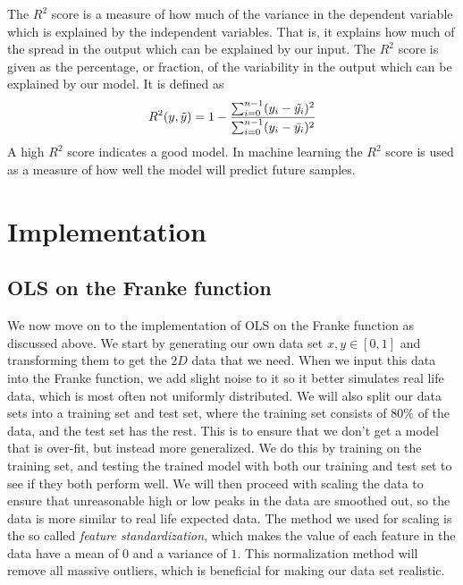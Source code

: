 \documentclass[english,notitlepage,reprint,nofootinbib]{revtex4-1}  %
\begin{document}
The $R^2$ score is a measure of how much of the variance in the dependent variable which is explained by the independent variables. That is, it explains how much of the spread in the output which can be explained by our input. The $R^2$ score is given as the percentage, or fraction, of the variability in the output which can be explained by our model. It is defined as 
\begin{align}
    R^2 (y, \Tilde{y}) = 1 - \frac{ \sum_{i=0}^{n-1} (y_{i} - \Tilde{y_{i}})^2} {\sum_{i=0}^{n-1} (y_{i} - \bar{y_{i}})^2}
\end{align}
A high $R^2$ score indicates a good model. In machine learning the $R^2$ score is used as a measure of how well the model will predict future samples.

\section{Implementation}\label{sec:IMPLEMENTATION}

\subsection{OLS on the Franke function}\label{subsec:OLS}
We now move on to the implementation of OLS on the Franke function as discussed above. We start by generating our own data set $x,y \in [0,1]$ and transforming them to get the $2D$ data that we need. When we input this data into the Franke function, we add slight noise to it so it better simulates real life data, which is most often not uniformly distributed. We will also split our data sets into a training set and test set, where the training set consists of $80 \%$ of the data, and the test set has the rest. This is to ensure that we don't get a model that is over-fit, but instead more generalized. We do this by training on the training set, and testing the trained model with both our training and test set to see if they both perform well. We will then proceed with scaling the data to ensure that unreasonable high or low peaks in the data are smoothed out, so the data is more similar to real life expected data. The method we used for scaling is the so called \textit{feature standardization}, which makes the value of each feature in the data have a mean of $0$ and a variance of $1$. This normalization method will remove all massive outliers, which is beneficial for making our data set realistic.
\end{document}
